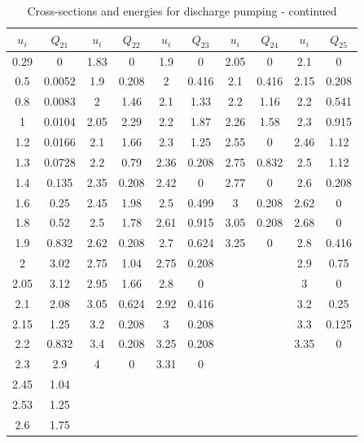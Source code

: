 \documentclass{report}
\begin{document}
\begin{appendices}
\begin{table}
\centering
\small
\caption{Cross-sections and energies for discharge pumping - continued}
\begin{tabular}{|c|c||c|c||c|c||c|c||c|c|}
\hline 
$u_i$ & $Q_{21}$ & $u_i$ & $Q_{22}$ & $u_i$ & $Q_{23}$ & $u_i$ & $Q_{24}$ & $u_i$ & $Q_{25}$ \\
\hline 
0.29 & 0      & 1.83  & 0     & 1.9  & 0     & 2.05 & 0     & 2.1  & 0     \\
0.5  & 0.0052 & 1.9   & 0.208 & 2    & 0.416 & 2.1  & 0.416 & 2.15 & 0.208 \\
0.8  & 0.0083 & 2     & 1.46  & 2.1  & 1.33  & 2.2  & 1.16  & 2.2  & 0.541 \\
1    & 0.0104 & 2.05  & 2.29  & 2.2  & 1.87  & 2.26 & 1.58  & 2.3  & 0.915 \\
1.2  & 0.0166 & 2.1   & 1.66  & 2.3  & 1.25  & 2.55 & 0     & 2.46 & 1.12  \\
1.3  & 0.0728 & 2.2   & 0.79  & 2.36 & 0.208 & 2.75 & 0.832 & 2.5  & 1.12  \\
1.4  & 0.135  & 2.35  & 0.208 & 2.42 & 0     & 2.77 & 0     & 2.6  & 0.208 \\
1.6  & 0.25   & 2.45  & 1.98  & 2.5  & 0.499 & 3    & 0.208 & 2.62 & 0     \\
1.8  & 0.52   & 2.5   & 1.78  & 2.61 & 0.915 & 3.05 & 0.208 & 2.68 & 0     \\
1.9  & 0.832  & 2.62  & 0.208 & 2.7  & 0.624 & 3.25 & 0     & 2.8  & 0.416 \\
2    & 3.02   & 2.75  & 1.04  & 2.75 & 0.208 &      &       & 2.9  & 0.75  \\
2.05 & 3.12   & 2.95  & 1.66  & 2.8  & 0     &      &       & 3    & 0     \\
2.1  & 2.08   & 3.05  & 0.624 & 2.92 & 0.416 &      &       & 3.2  & 0.25  \\
2.15 & 1.25   & 3.2   & 0.208 & 3    & 0.208 &      &       & 3.3  & 0.125 \\
2.2  & 0.832  & 3.4   & 0.208 & 3.25 & 0.208 &      &       & 3.35 & 0     \\
2.3  & 2.9    & 4     & 0     & 3.31 & 0     &      &       &      &       \\
2.45 & 1.04   &       &       &      &       &      &       &      &       \\
2.53 & 1.25   &       &       &      &       &      &       &      &       \\ 
2.6  & 1.75   &       &       &      &       &      &       &      &       \\ 

\end{tabular}
\end{table}
\end{appendices}
\end{document}

